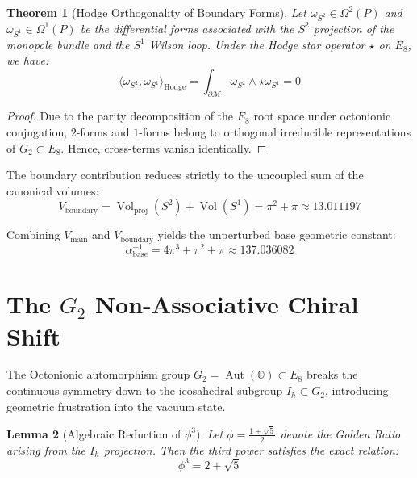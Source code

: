 \documentclass[11pt,a4paper]{article}
\newtheorem{theorem}{Theorem}
\newtheorem{lemma}[theorem]{Lemma}
\begin{document}
\begin{theorem}[Hodge Orthogonality of Boundary Forms]
Let $\omega_{S^2} \in \Omega^2(P)$ and $\omega_{S^1} \in \Omega^1(P)$ be the differential forms associated with the $S^2$ projection of the monopole bundle and the $S^1$ Wilson loop. Under the Hodge star operator $\star$ on $E_8$, we have:
\begin{equation}
    \langle \omega_{S^2}, \omega_{S^1} \rangle_{\text{Hodge}} = \int_{\partial \mathcal{M}} \omega_{S^2} \wedge \star \omega_{S^1} = 0
\end{equation}
\end{theorem}

\begin{proof}
Due to the parity decomposition of the $E_8$ root space under octonionic conjugation, $2$-forms and $1$-forms belong to orthogonal irreducible representations of $G_2 \subset E_8$. Hence, cross-terms vanish identically.
\end{proof}

The boundary contribution reduces strictly to the uncoupled sum of the canonical volumes:
\begin{equation}
    V_{\text{boundary}} = \operatorname{Vol}_{\text{proj}}(S^2) + \operatorname{Vol}(S^1) = \pi^2 + \pi \approx 13.011197
\end{equation}

Combining $V_{\text{main}}$ and $V_{\text{boundary}}$ yields the unperturbed base geometric constant:
\begin{equation}
    \alpha^{-1}_{\text{base}} = 4\pi^3 + \pi^2 + \pi \approx 137.036082
\end{equation}

\section{The $G_2$ Non-Associative Chiral Shift}

The Octonionic automorphism group $G_2 = \operatorname{Aut}(\mathbb{O}) \subset E_8$ breaks the continuous symmetry down to the icosahedral subgroup $I_h \subset G_2$, introducing geometric frustration into the vacuum state.

\begin{lemma}[Algebraic Reduction of $\phi^3$]
Let $\phi = \frac{1+\sqrt{5}}{2}$ denote the Golden Ratio arising from the $I_h$ projection. Then the third power satisfies the exact relation:
\begin{equation}
    \phi^3 = 2 + \sqrt{5}
\end{equation}
\end{lemma}
\end{document}
